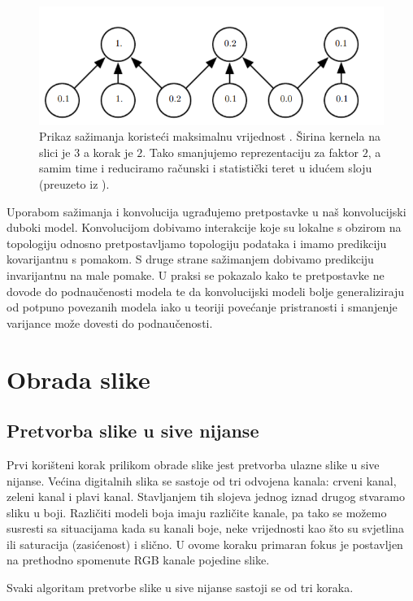 \documentclass[times, utf8, diplomski]{fer}
\theoremstyle{definition}
\begin{document}
\begin{figure}[h]
\centering
\includegraphics[scale=0.5]{pooling.png}
\caption{Prikaz sažimanja koristeći maksimalnu vrijednost . Širina kernela na slici je $3$ a korak je $2$. Tako smanjujemo reprezentaciju za faktor $2$, a samim time i reduciramo računski i statistički teret u idućem sloju (preuzeto iz \cite{Goodfellow-et-al-2016}).}
\label{konvolucija}
\end{figure}

Uporabom sažimanja i konvolucija ugrađujemo pretpostavke u naš konvolucijski duboki model. Konvolucijom dobivamo interakcije koje su lokalne s obzirom na topologiju odnosno pretpostavljamo topologiju podataka i imamo predikciju kovarijantnu s pomakom. S druge strane sažimanjem dobivamo predikciju invarijantnu na male pomake. U praksi se pokazalo kako te pretpostavke ne dovode do podnaučenosti modela te da konvolucijski modeli bolje generaliziraju od potpuno povezanih modela iako u teoriji povećanje pristranosti i smanjenje varijance može dovesti do podnaučenosti.

\chapter{Obrada slike}
\section{Pretvorba slike u sive nijanse}
Prvi korišteni korak prilikom obrade slike jest pretvorba ulazne slike u sive nijanse. Većina digitalnih slika se sastoje od tri odvojena kanala: crveni kanal, zeleni kanal i plavi kanal. Stavljanjem tih slojeva jednog iznad drugog stvaramo sliku u boji. Različiti modeli boja imaju različite kanale, pa tako se možemo susresti sa situacijama kada su kanali boje, neke vrijednosti kao što su svjetlina ili saturacija (zasićenost) i slično. U ovome koraku primaran fokus je postavljen na prethodno spomenute RGB kanale pojedine slike.

Svaki algoritam pretvorbe slike u sive nijanse sastoji se od tri koraka.
\end{document}
